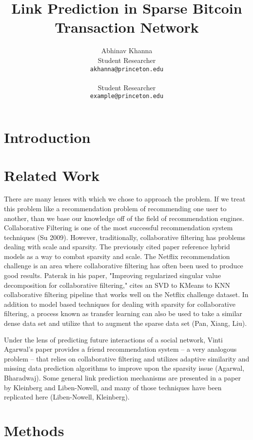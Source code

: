 \documentclass{article} %
\title{Link Prediction in Sparse Bitcoin Transaction Network}
\author{
Abhinav Khanna\\
Student Researcher\\
\texttt{akhanna@princeton.edu} \\
\And
 \\
Student Researcher \\
\texttt{example@princeton.edu} \\
}
\begin{document}
\maketitle

\begin{abstract}
\end{abstract}

\section{Introduction}

\section{Related Work}
There are many lenses with which we chose to approach the problem. If we treat this problem like a recommendation problem of recommending one user to another, than we base our knowledge off of the field of recommendation engines. Collaborative Filtering is one of the most successful recommendation system techniques (Su 2009). However, traditionally, collaborative filtering has problems dealing with scale and sparsity. The previously cited paper reference hybrid models as a way to combat sparsity and scale. The Netflix recommendation challenge is an area where collaborative filtering has often been used to produce good results. Paterak in his paper, "Improving regularized singular value decomposition for collaborative filtering," cites an SVD to KMeans to KNN collaborative filtering pipeline that works well on the Netflix challenge dataset. In addition to model based techniques for dealing with sparsity for collaborative filtering, a process known as transfer learning can also be used to take a similar dense data set and utilize that to augment the sparse data set (Pan, Xiang, Liu).

Under the lens of predicting future interactions of a social network, Vinti Agarwal's paper provides a friend recommendation system -- a very analogous problem -- that relies on collaborative filtering and utilizes adaptive similarity and missing data prediction algorithms to improve upon the sparsity issue (Agarwal, Bharadwaj). Some general link prediction mechanisms are presented in a paper by Kleinberg and Liben-Nowell, and many of those techniques have been replicated here (Liben-Nowell, Kleinberg).

\section{Methods}
\end{document}
